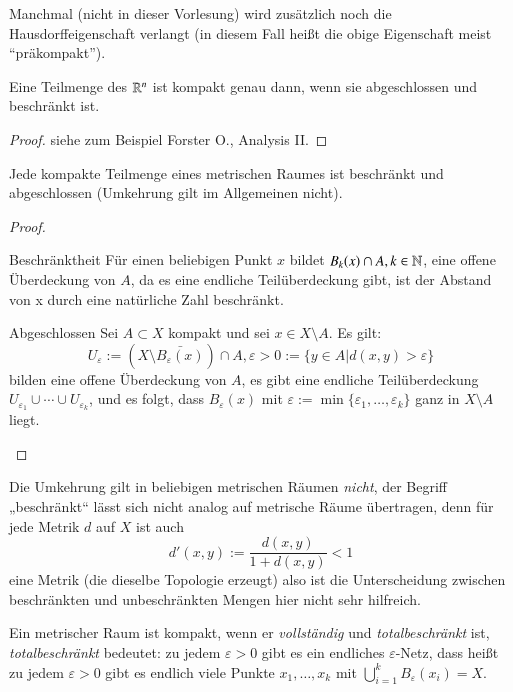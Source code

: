\documentclass[a4paper,10pt]{scrartcl}
\newcommand{\eps}{\varepsilon}
\begin{document}
\begin{note}\label{thm:6.3}
 Manchmal (nicht in dieser Vorlesung) wird zusätzlich noch die Hausdorffeigenschaft verlangt (in diesem Fall heißt die obige Eigenschaft meist "`präkompakt"').
\end{note}
\begin{st}\label{thm:1.6.4}
 Eine Teilmenge des $\mathbb{R}^n$ ist kompakt genau dann, wenn sie abgeschlossen und beschränkt ist.
\end{st}
\begin{proof}
 siehe zum Beispiel Forster O., Analysis II.
\end{proof}
\begin{st}\label{thm:1.6.5}
 Jede kompakte Teilmenge eines metrischen Raumes ist beschränkt und abgeschlossen (Umkehrung gilt im Allgemeinen nicht).
\end{st}
\begin{proof}
 \begin{seg}{Beschränktheit}
  Für einen beliebigen Punkt $x$ bildet $B_k(x)\cap A, k \in \mathbb{N}$, eine offene Überdeckung von $A$, da es eine endliche Teilüberdeckung gibt, ist der Abstand von x durch eine natürliche Zahl beschränkt.
 \end{seg}
\begin{seg}{Abgeschlossen}
 Sei $A\subset X$ kompakt und sei $x\in X\setminus A$. Es gilt:
\[
 U_\eps:=(X\setminus\bar{B_\eps(x)})\cap A, \eps>0 := \{ y\in A|d(x,y) > \eps\}
\]
bilden eine offene Überdeckung von $A$, es gibt eine endliche Teilüberdeckung $U_{\eps_1}\cup\dotsb  \cup U_{\eps_k}$, und es folgt, dass $B_\eps(x)$ mit $\eps:=\min\{\eps_1,\dotsc  ,\eps_k\}$ ganz in $X\setminus A$ liegt.
\begin{figure}[H]
\centering
 \fixme[fig26]
\caption{}
\end{figure}
\end{seg}
\end{proof}
Die Umkehrung gilt in beliebigen metrischen Räumen \emph{nicht}, der Begriff „beschränkt“ lässt sich nicht analog auf metrische Räume übertragen, denn für jede Metrik $d$ auf $X$ ist auch
\[
 d'(x,y):=\frac{d(x,y)}{1+d(x,y)}<1
\]
eine Metrik (die dieselbe Topologie erzeugt) also ist die Unterscheidung zwischen beschränkten und unbeschränkten Mengen hier nicht sehr hilfreich.
\begin{note*}
 Ein metrischer Raum ist kompakt, wenn er \emph{vollständig} und \emph{totalbeschränkt} ist, \emph{totalbeschränkt} bedeutet: zu jedem $\eps>0$ gibt es ein endliches $\eps$-Netz, dass heißt zu jedem $\eps>0$ gibt es endlich viele Punkte $x_1,\dotsc  ,x_k$ mit $\bigcup_{i=1}^kB_\eps(x_i)=X$.
\end{note*}
\end{document}
